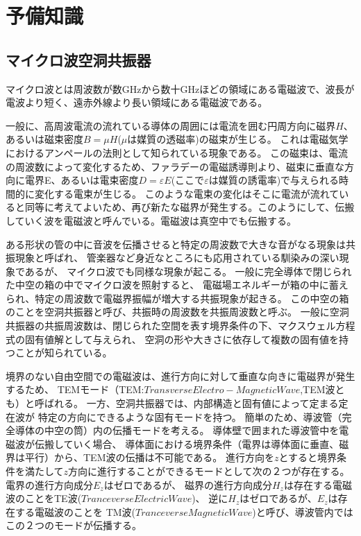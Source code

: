\section{予備知識}
\subsection*{マイクロ波空洞共振器}
マイクロ波とは周波数が数GHzから数十GHzほどの領域にある電磁波で、波長が電波より短く、遠赤外線より長い領域にある電磁波である。

一般に、高周波電流の流れている導体の周囲には電流を囲む円周方向に磁界$H$、あるいは磁束密度$B =μH$($μ$は媒質の透磁率)の磁束が生じる。
これは電磁気学におけるアンペールの法則として知られている現象である。
この磁束は、電流の周波数によって変化するため、ファラデーの電磁誘導則より、磁束に垂直な方向に電界E、あるいは電束密度$D =εE$(ここで$ε$は媒質の誘電率)で与えられる時間的に変化する電束が生じる。
このような電束の変化はそこに電流が流れていると同等に考えてよいため、再び新たな磁界が発生する。このようにして、伝搬していく波を電磁波と呼んでいる。電磁波は真空中でも伝搬する。

ある形状の管の中に音波を伝播させると特定の周波数で大きな音がなる現象は共振現象と呼ばれ、
管楽器など身近なところにも応用されている馴染みの深い現象であるが、
マイクロ波でも同様な現象が起こる。
一般に完全導体で閉じられた中空の箱の中でマイクロ波を照射すると、
電磁場エネルギーが箱の中に蓄えられ、特定の周波数で電磁界振幅が増大する共振現象が起きる。
この中空の箱のことを空洞共振器と呼び、共振時の周波数を共振周波数と呼ぶ。
一般に空洞共振器の共振周波数は、閉じられた空間を表す境界条件の下、マクスウェル方程式の固有値解として与えられ、
空洞の形や大きさに依存して複数の固有値を持つことが知られている。

境界のない自由空間での電磁波は、進行方向に対して垂直な向きに電磁界が発生するため、
TEMモード（TEM:$Transverse Electro-Magnetic Wave$,TEM波とも）と呼ばれる。
一方、空洞共振器では、内部構造と固有値によって定まる定在波が
特定の方向にできるような固有モードを持つ。
簡単のため、導波管（完全導体の中空の筒）内の伝播モードを考える。
導体壁で囲まれた導波管中を電磁波が伝搬していく場合、
導体面における境界条件（電界は導体面に垂直、磁界は平行）から、TEM波の伝播は不可能である。
進行方向を$z$とすると境界条件を満たして$z$方向に進行することができるモードとして次の２つが存在する。
電界の進行方向成分$E_z $はゼロであるが、
磁界の進行方向成分$H_z$は存在する電磁波のことをTE波($Tranceverse Electric Wave$)、
逆に$H_z$はゼロであるが、$E_z$は存在する電磁波のことを
TM波($Tranceverse Magnetic Wave$)と呼び、導波管内ではこの２つのモードが伝播する。

